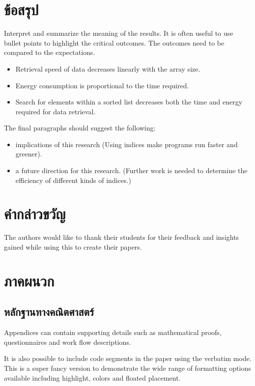 \documentclass[10pt,twocolumn,twoside,a4paper]{article}
\begin{document}
\section{ข้อสรุป}
\label{conclusion}
Interpret and summarize the meaning of the results. It is often useful to use bullet points to highlight the critical outcomes. The outcomes need to be compared to the expectations.

\begin{itemize}
\item Retrieval speed of data decreases linearly with the array size.
\item Energy consumption is proportional to the time required.
\item Search for elements within a sorted list decreases both the time and energy required for data retrieval.
\end{itemize}

 The final paragraphs should suggest the following:
 
 \begin{itemize}
 \item implications of this research (Using indices make programs run faster and greener).
 \item a future direction for this research. (Further work is needed to determine the efficiency of different kinds of indices.)
\end{itemize}

\section*{คำกล่าวขวัญ}
\label{Acknowledgment}
The authors would like to thank their students for their feedback and insights gained while using this to create their papers.

\section*{ภาคผนวก}
\label{appendix}
\subsection*{หลักฐานทางคณิตศาสตร์}
\label{proof}
Appendices can contain supporting details such as mathematical proofs, questionnaires and work flow descriptions. 

It is also possible to include code segments in the paper using the verbatim mode. This is a super fancy version to demonstrate the wide range of formatting options available including highlight, colors and floated placement.
\end{document}
